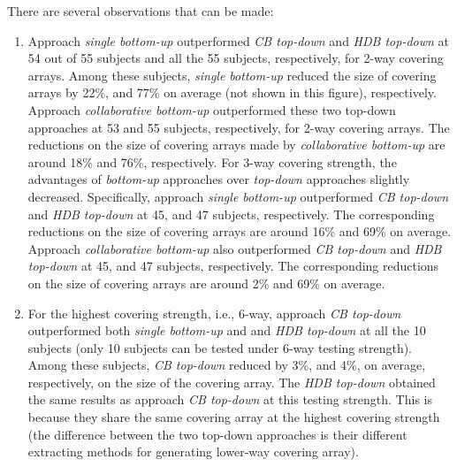 \documentclass[conference]{IEEEtran}
\theoremstyle{definition}
\begin{document}
There are several observations that can be made:

 \begin{enumerate}
 \item Approach \emph{single bottom-up} outperformed \emph{CB top-down} and \emph{HDB top-down} at 54 out of 55 subjects and all the 55 subjects, respectively, for 2-way covering arrays. Among these subjects, \emph{single bottom-up} reduced the size of covering arrays by 22\%, and 77\% on average (not shown in this figure), respectively. Approach \emph{collaborative bottom-up} outperformed these two top-down approaches at 53 and 55 subjects, respectively, for 2-way covering arrays. The reductions on the size of covering arrays made by \emph{collaborative bottom-up} are around 18\% and 76\%, respectively. For 3-way covering strength, the advantages of \emph{bottom-up} approaches over \emph{top-down} approaches slightly decreased. Specifically, approach \emph{single bottom-up}  outperformed \emph{CB top-down} and \emph{HDB top-down} at 45, and 47 subjects, respectively. The corresponding reductions on the size of covering arrays are around 16\% and 69\% on average.  Approach \emph{collaborative bottom-up} also outperformed \emph{CB top-down} and \emph{HDB top-down} at 45, and 47 subjects, respectively. The corresponding reductions on the size of covering arrays are around 2\% and 69\% on average.

 \item  For the highest covering strength, i.e., 6-way, approach \emph{CB top-down} outperformed both \emph{single bottom-up} and  and \emph{HDB top-down} at all the 10 subjects (only 10 subjects can be tested under 6-way testing strength).  Among these subjects, \emph{CB top-down} reduced by 3\%, and 4\%, on average, respectively, on the size of the covering array.
     The \emph{HDB top-down} obtained the same results as  approach \emph{CB top-down} at this testing strength. This is because they share the same covering array at the highest covering strength (the difference between the two top-down approaches is their different extracting methods for generating lower-way covering array).


\end{enumerate}
\end{document}
